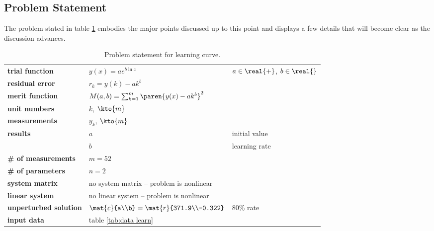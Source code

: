 \subsection{Problem Statement}  %
The problem stated in table \ref{tab:learn:problem statement} embodies the major points discussed up to this point and displays a few details that will become clear as the discussion advances.
  \begin{table}[h]  %
    \caption{Problem statement for learning curve.}
    \begin{center}
      \begin{tabular}{lll}
        \bf{trial function} & $y(x) = a e^{b\ln x}$ & $a\in\real{+}$, $b\in\real{}$ \\
        \bf{residual error} & $r_{k} = y(k) - a k^{b}$ & \\
        \bf{merit function} & $M(a, b) = \sum_{k=1}^{m}\paren{y(x) - a k^{b}}^{2}$  & \\
        \bf{unit numbers}   & $k$, $\kto{m}$ &  \\
        \bf{measurements}   & $y_{k}$, $\kto{m}$ &  \\
        \bf{results}        & $a$ &  initial value \\
                            & $b$ &  learning rate\\
        \bf{\# of measurements} & $m = 52$ &  \\
        \bf{\# of parameters}   & $n = 2$ &  \\
        \bf{system matrix}  & no system matrix -- problem is nonlinear \\
        \bf{linear system}  & no linear system -- problem is nonlinear \\
        \bf{unperturbed solution} & $\mat{c}{a\\b} = \mat{r}{371.9\\-0.322}$ & 80\% rate\\
        \bf{input data}     & table \ref{tab:data learn}
      \end{tabular}
    \end{center}
  \label{tab:learn:problem statement}
  \end{table}%

